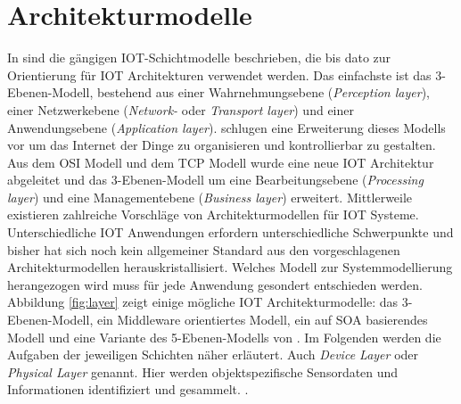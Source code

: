 \documentclass[BMR,Bachelor,ngerman]{twbook}%
\begin{document}
\section{Architekturmodelle}
In  sind die gängigen \ac{IOT}-Schichtmodelle beschrieben, die bis dato zur Orientierung für \ac{IOT} Architekturen verwendet werden. Das einfachste ist das 3-Ebenen-Modell, bestehend aus einer Wahrnehmungsebene (\emph{Perception layer}), einer Netzwerkebene (\emph{Network-} oder \emph{Transport layer}) und einer Anwendungsebene (\emph{Application layer}).
%
 schlugen eine Erweiterung dieses Modells vor um das Internet der Dinge zu organisieren und kontrollierbar zu gestalten. Aus dem \ac{OSI} Modell und dem \ac{TCP} Modell wurde eine neue \ac{IOT} Architektur abgeleitet und das 3-Ebenen-Modell um eine Bearbeitungsebene (\emph{Processing layer}) und eine Managementebene (\emph{Business layer}) erweitert.
%
%
Mittlerweile existieren zahlreiche Vorschläge von Architekturmodellen für \ac{IOT} Systeme. Unterschiedliche \ac{IOT} Anwendungen erfordern unterschiedliche Schwerpunkte und bisher hat sich noch kein allgemeiner Standard aus den vorgeschlagenen Architekturmodellen herauskristallisiert. Welches Modell zur Systemmodellierung herangezogen wird muss für jede Anwendung gesondert entschieden werden. Abbildung \ref{fig:layer} zeigt einige mögliche \ac{IOT} Architekturmodelle: das 3-Ebenen-Modell, ein Middleware orientiertes Modell, ein auf \ac{SOA} basierendes Modell und eine Variante des 5-Ebenen-Modells von . Im Folgenden werden die Aufgaben der jeweiligen Schichten näher erläutert.
{} Auch \emph{Device Layer} oder \emph{Physical Layer} genannt. Hier werden objektspezifische Sensordaten und Informationen identifiziert und gesammelt. \cite{khan2012future}.
\end{document}
